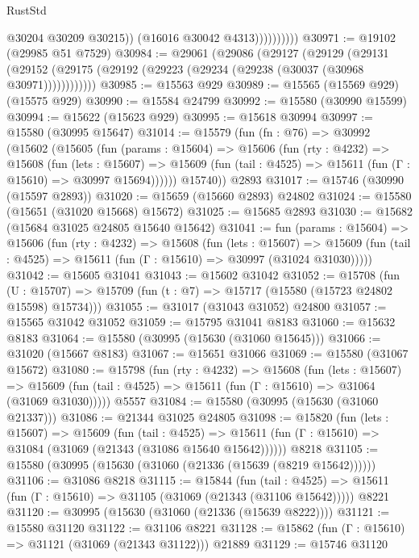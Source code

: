\begin{lexlean}{RustStd}
\begin{coremodule}
                          @30204
                          @30209
                          @30215))
                      (@16016 @30042 @4313))))))))))
@30971 := @19102 (@29985 @51 @7529)
@30984 := @29061
    (@29086
      (@29127
        (@29129
          (@29131 (@29152 (@29175 (@29192 (@29223 (@29234 (@29238 (@30037 (@30968 @30971))))))))))))
@30985 := @15563 @929
@30989 := @15565 (@15569 @929) (@15575 @929)
@30990 := @15584 @24799
@30992 := @15580 (@30990 @15599)
@30994 := @15622 (@15623 @929)
@30995 := @15618 @30994
@30997 := @15580 (@30995 @15647)
@31014 := @15579
    (fun (fn : @76) =>
    @30992
      (@15602
        (@15605
          (fun (params : @15604) =>
          @15606
            (fun (rty : @4232) =>
            @15608
              (fun (lets : @15607) =>
              @15609 (fun (tail : @4525) => @15611 (fun (Γ : @15610) => @30997 @15694))))))
        @15740))
    @2893
@31017 := @15746 (@30990 (@15597 @2893))
@31020 := @15659 (@15660 @2893) @24802
@31024 := @15580 (@15651 (@31020 @15668) @15672)
@31025 := @15685 @2893
@31030 := @15682 (@15684 @31025 @24805 @15640 @15642)
@31041 := fun (params : @15604) =>
  @15606
    (fun (rty : @4232) =>
    @15608
      (fun (lets : @15607) =>
      @15609 (fun (tail : @4525) => @15611 (fun (Γ : @15610) => @30997 (@31024 @31030)))))
@31042 := @15605 @31041
@31043 := @15602 @31042
@31052 := @15708
    (fun (U : @15707) => @15709 (fun (t : @7) => @15717 (@15580 (@15723 @24802 @15598) @15734)))
@31055 := @31017 (@31043 @31052) @24800
@31057 := @15565 @31042 @31052
@31059 := @15795 @31041 @8183
@31060 := @15632 @8183
@31064 := @15580 (@30995 (@15630 (@31060 @15645)))
@31066 := @31020 (@15667 @8183)
@31067 := @15651 @31066
@31069 := @15580 (@31067 @15672)
@31080 := @15798
    (fun (rty : @4232) =>
    @15608
      (fun (lets : @15607) =>
      @15609 (fun (tail : @4525) => @15611 (fun (Γ : @15610) => @31064 (@31069 @31030)))))
    @5557
@31084 := @15580 (@30995 (@15630 (@31060 @21337)))
@31086 := @21344 @31025 @24805
@31098 := @15820
    (fun (lets : @15607) =>
    @15609
      (fun (tail : @4525) =>
      @15611 (fun (Γ : @15610) => @31084 (@31069 (@21343 (@31086 @15640 @15642))))))
    @8218
@31105 := @15580 (@30995 (@15630 (@31060 (@21336 (@15639 (@8219 @15642))))))
@31106 := @31086 @8218
@31115 := @15844
    (fun (tail : @4525) => @15611 (fun (Γ : @15610) => @31105 (@31069 (@21343 (@31106 @15642)))))
    @8221
@31120 := @30995 (@15630 (@31060 (@21336 (@15639 @8222))))
@31121 := @15580 @31120
@31122 := @31106 @8221
@31128 := @15862 (fun (Γ : @15610) => @31121 (@31069 (@21343 @31122))) @21889
@31129 := @15746 @31120

\end{coremodule}
\end{lexlean}
